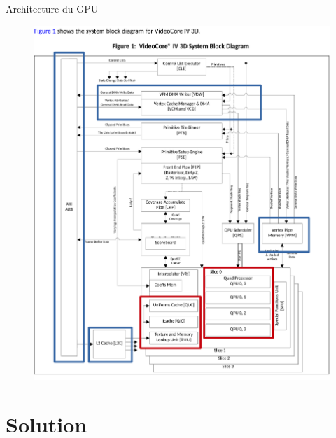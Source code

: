\documentclass{bredelebeamer}
\begin{document}

\begin{frame}{Architecture du GPU}

\begin{figure}
\centering
\includegraphics[scale=0.4]{images/archOverview.pdf}
\end{figure}

\end{frame}





\section{Solution}

\end{document}
